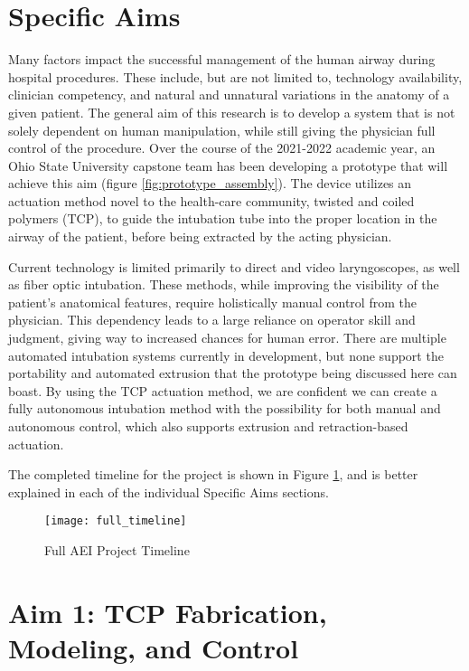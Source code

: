 \section*{Specific Aims}
\label{parts:specific_aims}

Many factors impact the successful management of the human airway during hospital procedures. These include, but are not limited to, technology availability, clinician competency, and natural and unnatural variations in the anatomy of a given patient. The general aim of this research is to develop a system that is not solely dependent on human manipulation, while still giving the physician full control of the procedure. Over the course of the 2021-2022 academic year, an Ohio State University capstone team has been developing a prototype that will achieve this aim (figure \ref{fig:prototype_assembly}). The device utilizes an actuation method novel to the health-care community, twisted and coiled polymers (TCP), to guide the intubation tube into the proper location in the airway of the patient, before being extracted by the acting physician.

Current technology is limited primarily to direct and video laryngoscopes, as well as fiber optic intubation. These methods, while improving the visibility of the patient's anatomical features, require holistically manual control from the physician. This dependency leads to a large reliance on operator skill and judgment, giving way to increased chances for human error. There are multiple automated intubation systems currently in development, but none support the portability and automated extrusion that the prototype being discussed here can boast. By using the TCP actuation method, we are confident we can create a fully autonomous intubation method with the possibility for both manual and autonomous control, which also supports extrusion and retraction-based actuation.

The completed timeline for the project is shown in Figure \ref{fig:full_timeline}, and is better explained in each of the individual Specific Aims sections.

\begin{figure}[ht]
	\centering
	\texttt{[image: full\_timeline]}
	\caption{Full AEI Project Timeline}
	\label{fig:full_timeline}
\end{figure}

	\section{Aim 1: TCP Fabrication, Modeling, and Control}
	\label{subsect:aim1}
	
